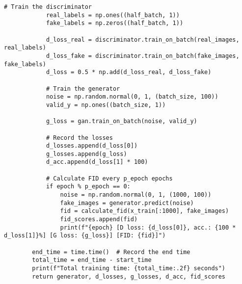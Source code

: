 \begin{lstlisting}[style=mypython, caption=Explore GAN with more convolutional layers 2]
            # Train the discriminator
            real_labels = np.ones((half_batch, 1))
            fake_labels = np.zeros((half_batch, 1))
    
            d_loss_real = discriminator.train_on_batch(real_images, real_labels)
            d_loss_fake = discriminator.train_on_batch(fake_images, fake_labels)
            d_loss = 0.5 * np.add(d_loss_real, d_loss_fake)
    
            # Train the generator
            noise = np.random.normal(0, 1, (batch_size, 100))
            valid_y = np.ones((batch_size, 1))
    
            g_loss = gan.train_on_batch(noise, valid_y)
    
            # Record the losses
            d_losses.append(d_loss[0])
            g_losses.append(g_loss)
            d_acc.append(d_loss[1] * 100)
            
            # Calculate FID every p_epoch epochs
            if epoch % p_epoch == 0:
                noise = np.random.normal(0, 1, (1000, 100))
                fake_images = generator.predict(noise)
                fid = calculate_fid(x_train[:1000], fake_images)
                fid_scores.append(fid)
                print(f"{epoch} [D loss: {d_loss[0]}, acc.: {100 * d_loss[1]}%] [G loss: {g_loss}] [FID: {fid}]")
    
        end_time = time.time()  # Record the end time
        total_time = end_time - start_time
        print(f"Total training time: {total_time:.2f} seconds")
        return generator, d_losses, g_losses, d_acc, fid_scores
    
\end{lstlisting}

